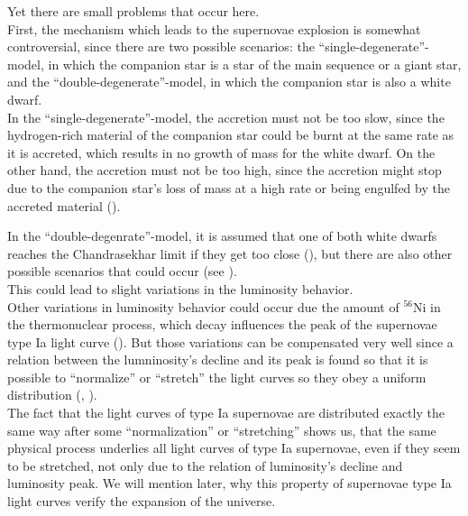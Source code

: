 \noindent Yet there are small problems that occur here. \\
First, the mechanism which leads to the supernovae explosion is somewhat controversial, since there are two possible scenarios: the ``single-degenerate''-model, in which the companion star is a star of the main sequence or a giant star, and the ``double-degenerate''-model, in which the companion star is also a white dwarf. \\

\noindent In the ``single-degenerate''-model, the accretion must not be too slow, since the hydrogen-rich material of the companion star could be burnt at the same rate as it is accreted, which results in no growth of mass for the white dwarf. On the other hand, the accretion must not be too high, since the accretion might stop due to the companion star's loss of mass at a high rate or being engulfed by the accreted material (\cite[p. 308]{Maguire2017}).

\noindent In the ``double-degenrate''-model, it is assumed that one of both white dwarfs reaches the Chandrasekhar limit if they get too close (\cite[p. 48]{Bartelmann2019}), but there are also other possible scenarios that could occur (see \cite[p. 308/309]{Maguire2017}). \\
\noindent This could lead to slight variations in the luminosity behavior. \\


\noindent Other variations in luminosity behavior could occur due the amount of $^{56}$Ni in the thermonuclear process, which decay influences the peak of the supernovae type Ia light curve (\cite[p. 295]{Maguire2017}). But those variations can be compensated very well since a relation between the lumninosity's decline and its peak is found so that it is possible to ``normalize'' or ``stretch'' the light curves so they obey a uniform distribution (\cite[p. 4]{Perlmutter2003}, \cite{Phillips1993}).\\
The fact that the light curves of type Ia supernovae are distributed exactly the same way after some ``normalization'' or ``stretching'' shows us, that the same physical process underlies all light curves of type Ia supernovae, even if they seem to be stretched, not only due to the relation of luminosity's decline and luminosity peak. We will mention later, why this property of supernovae type Ia light curves verify the expansion of the universe.

